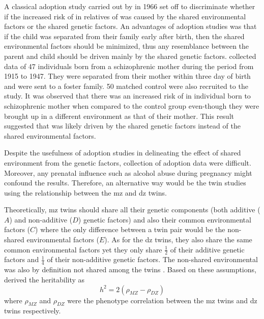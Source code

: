 	A classical adoption study carried out by \citet{HESTON1966} in 1966 set off to discriminate whether if the increased risk of  in relatives of  was caused by the shared environmental factors or the shared genetic factors. 
	An advantages of adoption studies was that if the child was separated from their family early after birth, then the shared environmental factors should be minimized, thus any resemblance between the parent and child should be driven mainly by the shared genetic factors.
	\citet{HESTON1966} collected data of 47 individuals born from a schizophrenic mother during the period from 1915 to 1947. 
	They were separated from their mother within three day of birth and were sent to a foster family. 
	50 matched control were also recruited to the study.
	It was observed that there was an increased risk of  in individual born to schizophrenic mother when compared to the control group even-though they were brought up in a different environment as that of their mother.
	This result suggested that  was likely driven by the shared genetic factors instead of the shared environmental factors.
	
	Despite the usefulness of adoption studies in delineating the effect of shared environment from the genetic factors, collection of adoption data were difficult. 
	Moreover, any prenatal influence such as alcohol abuse during pregnancy might confound the results.
	Therefore, an alternative way would be the twin studies using the relationship between the \gls{mz} and \gls{dz} twins.
	
	Theoretically, \gls{mz} twins should share all their genetic components (both additive ($A$) and non-additive ($D$) genetic factors) and also their common environmental factors ($C$) where the only difference between a twin pair would be the non-shared environmental factors ($E$). 
	As for the \gls{dz} twins, they also share the same common environmental factors yet they only share $\frac{1}{2}$ of their additive genetic factors and $\frac{1}{4}$ of their non-additive genetic factors. 
	The non-shared environmental was also by definition not shared among the twins \citep{Rijsdijk2002}.
	Based on these assumptions, \cite{Falconer1996} derived the heritability as
	\begin{equation}
	h^2 = 2(\rho_{MZ}-\rho_{DZ})
	\end{equation}
	where $\rho_{MZ}$ and $\rho_{DZ}$ were the phenotype correlation between the \gls{mz} twins and \gls{dz} twins respectively.
	
